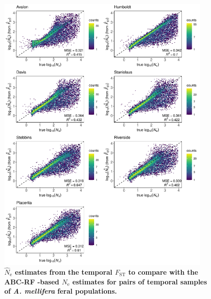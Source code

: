 \documentclass[a4paper, 12pt]{article}
\begin{document}
\begin{figure}[ht]
  \centering
  \includegraphics[width=0.95\textwidth]{Figures/FigureS26_combined_plot_fstNE.pdf}
  \small\caption{\textbf{$\hat N_{\mathrm{e}}$ estimates from the temporal $F_{\mathrm{ST}}$ to compare with the ABC-RF -based $\hat N_{\mathrm{e}}$ estimates for pairs of temporal samples of \textit{A. mellifera} feral populations.}}
  \label{fig:supple_feralbee_fstne}
\end{figure}
\end{document}
